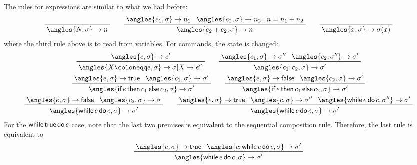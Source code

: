 \documentclass[class=scrartcl]{standalone}
\begin{document}
The rules for expressions are similar to what we had before:
\[
  \prfaxiom{\angles{N, \sigma} \to n} \qquad
  \prftree{\angles{e_1, \sigma} \to n_1}
          {\angles{e_2, \sigma} \to n_2}
          {n = n_1 + n_2}
          {\angles{e_2 + e_2, \sigma} \to n} \qquad
  \prfaxiom{\angles{x, \sigma} \to \sigma(x)}
\]
where the third rule above is to read from variables.
For commands, the state is changed:
\begin{gather*}
  \prftree{\angles{e, \sigma} \to e'}
          {\angles{X \coloneqq e, \sigma} \to \sigma[X \to e']} \qquad
  \prftree{\angles{c_1, \sigma} \to \sigma''}
          {\angles{c_2, \sigma''} \to \sigma'}
          {\angles{c_1 ; c_2, \sigma} \to \sigma'} \\
  \prftree{\angles{e, \sigma} \to \ptrue}
          {\angles{c_1, \sigma} \to \sigma'}
          {\angles{\pifthenelse{e}{c_1}{c_2}, \sigma} \to \sigma'} \qquad
  \prftree{\angles{e, \sigma} \to \pfalse}
          {\angles{c_2, \sigma} \to \sigma'}
          {\angles{\pifthenelse{e}{c_1}{c_2}, \sigma} \to \sigma'} \\
  \prftree{\angles{e, \sigma} \to \pfalse}
          {\angles{c_2, \sigma} \to \sigma}
          {\angles{\pwhiledo{e}{c}, \sigma} \to \sigma'} \qquad
  \prftree{\angles{e, \sigma} \to \ptrue}
          {\angles{c, \sigma} \to \sigma''}
          {\angles{\pwhiledo{e}{c}, \sigma''} \to \sigma'}
          {\angles{\pwhiledo{e}{c}, \sigma} \to \sigma'}
\end{gather*}
For the \(\operatorname{\textsf{while}}{\textsf{true}}\operatorname{\textsf{do}}{c}\) case, note that the last two premises
is equivalent to the sequential composition rule.
Therefore, the last rule is equivalent to
\[
  \prftree{\angles{e, \sigma} \to \ptrue}
          {\angles{c; \pwhiledo{e}{c}, \sigma} \to \sigma'}
          {\angles{\pwhiledo{e}{c}, \sigma} \to \sigma'}
\]
\end{document}
